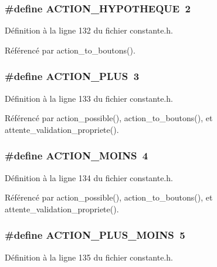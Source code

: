 \subsubsection{\setlength{\rightskip}{0pt plus 5cm}\#define ACTION\_\-HYPOTHEQUE~2}\label{constante_8h_373dd36bea5fb6256211848902ab4b65}




D\'{e}finition \`{a} la ligne 132 du fichier constante.h.

R\'{e}f\'{e}renc\'{e} par action\_\-to\_\-boutons().
\subsubsection{\setlength{\rightskip}{0pt plus 5cm}\#define ACTION\_\-PLUS~3}\label{constante_8h_65f36e3e7153adbceabf84d48fef802b}




D\'{e}finition \`{a} la ligne 133 du fichier constante.h.

R\'{e}f\'{e}renc\'{e} par action\_\-possible(), action\_\-to\_\-boutons(), et attente\_\-validation\_\-propriete().
\subsubsection{\setlength{\rightskip}{0pt plus 5cm}\#define ACTION\_\-MOINS~4}\label{constante_8h_fc684f09ea2d95fff6d9dd12ac01c5cf}




D\'{e}finition \`{a} la ligne 134 du fichier constante.h.

R\'{e}f\'{e}renc\'{e} par action\_\-possible(), action\_\-to\_\-boutons(), et attente\_\-validation\_\-propriete().
\subsubsection{\setlength{\rightskip}{0pt plus 5cm}\#define ACTION\_\-PLUS\_\-MOINS~5}\label{constante_8h_bba8f560c39a4ef2d822a0c317133d61}




D\'{e}finition \`{a} la ligne 135 du fichier constante.h.

